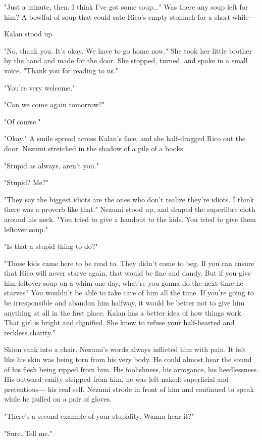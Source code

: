 "Just a minute, then. I think I've got some soup..." Was there any soup
left for him? A bowlful of soup that could sate Rico's empty stomach for
a short while―

Kalan stood up.

"No, thank you. It's okay. We have to go home now." She took her little
brother by the hand and made for the door. She stopped, turned, and
spoke in a small voice. "Thank you for reading to us."

"You're very welcome."

"Can we come again tomorrow?"

"Of course."

"Okay." A smile spread across Kalan's face, and she half-dragged Rico
out the door. Nezumi stretched in the shadow of a pile of a books.

"Stupid as always, aren't you."

"Stupid? Me?"

"They say the biggest idiots are the ones who don't realize they're
idiots. I think there was a proverb like that." Nezumi stood up, and
draped the superfibre cloth around his neck. "You tried to give a
handout to the kids. You tried to give them leftover soup."

"Is that a stupid thing to do?"

"Those kids came here to be read to. They didn't come to beg. If you can
ensure that Rico will never starve again, that would be fine and dandy.
But if you give him leftover soup on a whim one day, what're you gonna
do the next time he starves? You wouldn't be able to take care of him
all the time. If you're going to be irresponsible and abandon him
halfway, it would be better not to give him anything at all in the first
place. Kalan has a better idea of how things work. That girl is bright
and dignified. She knew to refuse your half-hearted and reckless
charity."

Shion sank into a chair. Nezumi's words always inflicted him with pain.
It felt like his skin was being torn from his very body. He could almost
hear the sound of his flesh being ripped from him. His foolishness, his
arrogance, his heedlessness. His outward vanity stripped from him, he
was left naked: superficial and pretentious― his real self. Nezumi
strode in front of him and continued to speak while he pulled on a pair
of gloves.

"There's a second example of your stupidity. Wanna hear it?"

"Sure. Tell me."

